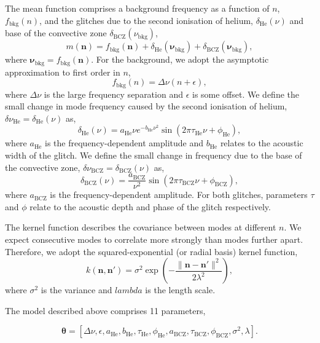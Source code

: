 \documentclass[linenumbers,modern]{aastex631dm}
\newcommand{\helium}{\mathrm{He}}
\newcommand{\bcz}{\mathrm{BCZ}}
\newcommand{\bkg}{\mathrm{bkg}}
\begin{document}
The mean function comprises a background frequency as a function of \(n\),
\(f_\bkg(n)\), and the glitches due to the second ionisation of helium,
\(\delta_\helium(\nu)\) and base of the convective zone
\(\delta_\bcz(\nu_\bkg)\),
%
\begin{equation}
    m(\bm n) = f_\bkg(\bm n) + \delta_\helium(\bm\nu_\bkg) +
    \delta_\bcz(\bm\nu_\bkg),
\end{equation}
%
where \(\bm\nu_\bkg = f_\bkg(\bm n)\). For the background, we adopt the
asymptotic approximation to first order in \(n\),
%
\begin{equation}
    f_\bkg(n) = \Delta\nu (n + \epsilon),
\end{equation}
%
where \(\Delta\nu\) is the large frequency separation and \(\epsilon\) is some
offset. We define the small change in mode frequency caused by the second
ionisation of helium, \(\delta\nu_\helium = \delta_\helium(\nu)\) as,
%
\begin{equation}
    \delta_\helium(\nu) = a_\helium \nu e^{- b_\helium \nu^2}
    \sin\left( 2 \pi \tau_\helium \nu + \phi_\helium \right),
\end{equation}
%
where \(a_\helium\) is the frequency-dependent amplitude and \(b_\helium\)
relates to the acoustic width of the glitch. We define the small change in
frequency due to the base of the convective zone,
\(\delta\nu_\bcz = \delta_\bcz(\nu)\) as,
%
\begin{equation}
    \delta_\bcz(\nu) = \frac{a_\bcz}{\nu^2}
    \sin\left( 2 \pi \tau_\bcz \nu + \phi_\bcz \right),
\end{equation}
%
where \(a_\bcz\) is the frequency-dependent amplitude. For both glitches,
parameters \(\tau\) and \(\phi\) relate to the acoustic depth and phase of
the glitch respectively.

The kernel function describes the covariance between modes at different \(n\).
We expect consecutive modes to correlate more strongly than modes further
apart. Therefore, we adopt the squared-exponential (or radial basis) kernel
function,
%
\begin{equation}
    k(\bm n, \bm n') = \sigma^2 
    \exp\left(- \frac{\| \bm n - \bm n' \|^2}{2\lambda^2}\right),
\end{equation}
%
where \(\sigma^2\) is the variance and \(lambda\) is the length scale.

The model described above comprises 11 parameters,

\begin{equation}
    \bm\theta = [\Delta\nu, \epsilon, a_\helium, b_\helium, \tau_\helium,
    \phi_\helium, a_\bcz, \tau_\bcz, \phi_\bcz, \sigma^2, \lambda].
\end{equation}
\end{document}

